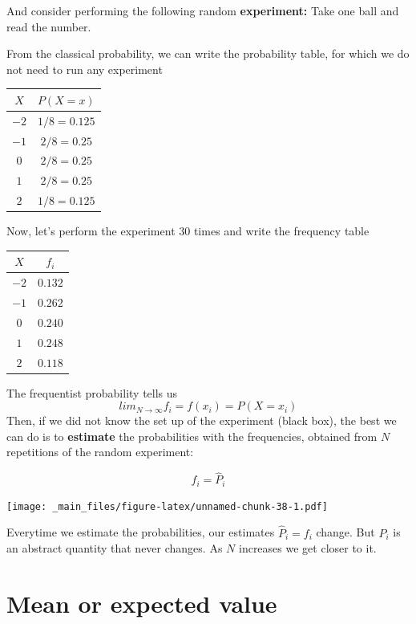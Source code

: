 \documentclass[
]{book}
\begin{document}
And consider performing the following random \textbf{experiment:} Take one ball and read the number.

From the classical probability, we can write the probability table, for which we do not need to run any experiment

\begin{longtable}[]{@{}cc@{}}
\toprule\noalign{}
\(X\) & \(P(X=x)\) \\
\midrule\noalign{}
\endhead
\bottomrule\noalign{}
\endlastfoot
\(-2\) & \(1/8=0.125\) \\
\(-1\) & \(2/8=0.25\) \\
\(0\) & \(2/8=0.25\) \\
\(1\) & \(2/8=0.25\) \\
\(2\) & \(1/8=0.125\) \\
\end{longtable}

Now, let's perform the experiment \(30\) times and write the frequency table

\begin{longtable}[]{@{}cc@{}}
\toprule\noalign{}
\(X\) & \(f_i\) \\
\midrule\noalign{}
\endhead
\bottomrule\noalign{}
\endlastfoot
\(-2\) & \(0.132\) \\
\(-1\) & \(0.262\) \\
\(0\) & \(0.240\) \\
\(1\) & \(0.248\) \\
\(2\) & \(0.118\) \\
\end{longtable}

The frequentist probability tells us
\[lim_{N \rightarrow \infty} f_i = f(x_i)=P(X=x_i)\]
Then, if we did not know the set up of the experiment (black box), the best we can do is to \textbf{estimate} the probabilities with the frequencies, obtained from \(N\) repetitions of the random experiment:

\[f_i = \hat{P}_i\]

\texttt{[image: \_main\_files/figure-latex/unnamed-chunk-38-1.pdf]}

Everytime we estimate the probabilities, our estimates \(\hat{P}_i=f_i\) change. But \(P_i\) is an abstract quantity that never changes. As \(N\) increases we get closer to it.

\hypertarget{mean-or-expected-value}{%
\section{Mean or expected value}\label{mean-or-expected-value}}
\end{document}
